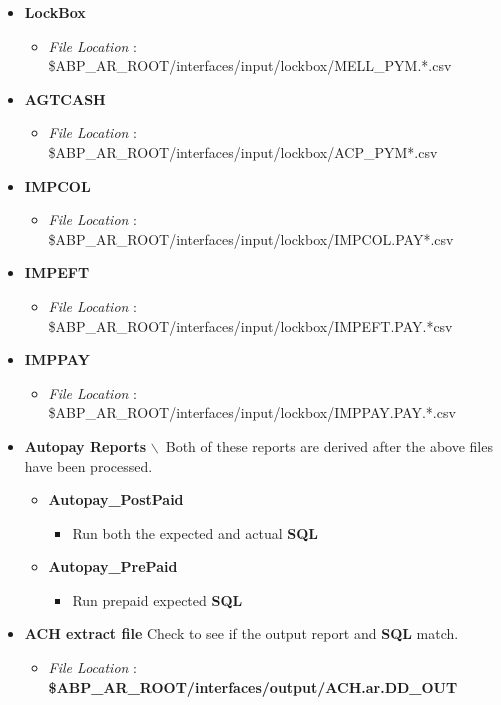 \documentclass[12pt,twoside]{article}
\begin{document}
\begin{itemize}
\item \textbf{LockBox}
\begin{itemize}
\item \emph{File Location} :
\$ABP\_AR\_ROOT/interfaces/input/lockbox/MELL\_PYM.*.csv
\end{itemize}
\item \textbf{AGTCASH}
\begin{itemize}
\item \emph{File Location} :
\$ABP\_AR\_ROOT/interfaces/input/lockbox/ACP\_PYM*.csv
\end{itemize}
\item \textbf{IMPCOL}
\begin{itemize}
\item \emph{File Location} :
\$ABP\_AR\_ROOT/interfaces/input/lockbox/IMPCOL.PAY*.csv
\end{itemize}
\item \textbf{IMPEFT}
\begin{itemize}
\item \emph{File Location} :
\$ABP\_AR\_ROOT/interfaces/input/lockbox/IMPEFT.PAY.*csv
\end{itemize}
\item \textbf{IMPPAY}
\begin{itemize}
\item \emph{File Location} :
\$ABP\_AR\_ROOT/interfaces/input/lockbox/IMPPAY.PAY.*.csv
\end{itemize}
\item \textbf{Autopay Reports} $\backslash$\ Both of these reports are derived after
the above files have been processed.
\begin{itemize}
\item \textbf{Autopay\_PostPaid}
\begin{itemize}
\item Run both the expected and actual \textbf{SQL}
\end{itemize}
\item \textbf{Autopay\_PrePaid}
\begin{itemize}
\item Run prepaid expected \textbf{SQL}
\end{itemize}
\end{itemize}
\item \textbf{ACH extract file} 
Check to see if the output report and
\textbf{SQL} match.
\begin{itemize}
\item \emph{File Location} :
\textbf{\$ABP\_AR\_ROOT/interfaces/output/ACH.ar.DD\_OUT} \\
\end{itemize}
\end{itemize}
\end{document}
